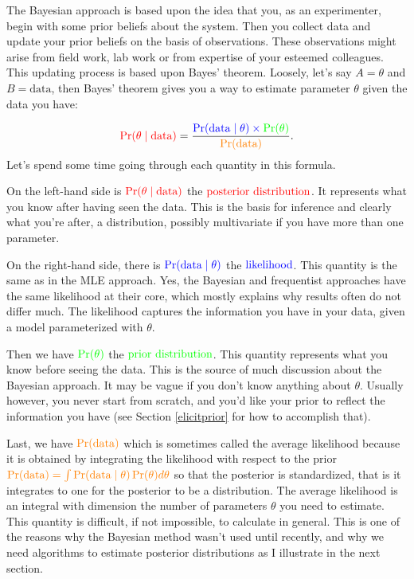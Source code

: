 \documentclass[
  12pt,
]{krantz}
\begin{document}
The Bayesian approach is based upon the idea that you, as an experimenter, begin with some prior beliefs about the system. Then you collect data and update your prior beliefs on the basis of observations. These observations might arise from field work, lab work or from expertise of your esteemed colleagues. This updating process is based upon Bayes' theorem. Loosely, let's say \(A = \theta\) and \(B = \text{data}\), then Bayes' theorem gives you a way to estimate parameter \(\theta\) given the data you have:

\[{\color{red}{\Pr(\theta \mid \text{data})}} = \frac{\color{blue}{\Pr(\text{data} \mid \theta)} \times \color{green}{\Pr(\theta)}}{\color{orange}{\Pr(\text{data})}}.\]
Let's spend some time going through each quantity in this formula.

On the left-hand side is \(\color{red}{\Pr(\theta \mid \text{data})}\) the \(\color{red}{\text{posterior distribution}}\). It represents what you know after having seen the data. This is the basis for inference and clearly what you're after, a distribution, possibly multivariate if you have more than one parameter.

On the right-hand side, there is \(\color{blue}{\Pr(\text{data} \mid \theta)}\) the \(\color{blue}{\text{likelihood}}\). This quantity is the same as in the MLE approach. Yes, the Bayesian and frequentist approaches have the same likelihood at their core, which mostly explains why results often do not differ much. The likelihood captures the information you have in your data, given a model parameterized with \(\theta\).

Then we have \(\color{green}{\Pr(\theta)}\) the \(\color{green}{\text{prior distribution}}\). This quantity represents what you know before seeing the data. This is the source of much discussion about the Bayesian approach. It may be vague if you don't know anything about \(\theta\). Usually however, you never start from scratch, and you'd like your prior to reflect the information you have (see Section \ref{elicitprior} for how to accomplish that).

Last, we have \(\color{orange}{\Pr(\text{data})}\) which is sometimes called the average likelihood because it is obtained by integrating the likelihood with respect to the prior \(\color{orange}{\Pr(\text{data}) = \int{\Pr(\text{data} \mid \theta)\Pr(\theta) d\theta}}\) so that the posterior is standardized, that is it integrates to one for the posterior to be a distribution. The average likelihood is an integral with dimension the number of parameters \(\theta\) you need to estimate. This quantity is difficult, if not impossible, to calculate in general. This is one of the reasons why the Bayesian method wasn't used until recently, and why we need algorithms to estimate posterior distributions as I illustrate in the next section.
\end{document}
